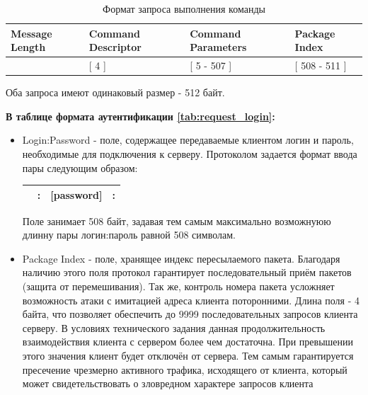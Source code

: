 \begin{table}[h]
	\centering
	\begin{tabular}[center]{| M{2.5cm} | M{2.0cm} | M{7.0cm} | M{2.5cm} |}
	\hline
	Message Length & Command Descriptor & Command Parameters & Package Index \\ \hline
	[ 0 - 3 ] & [ 4 ] & [ 5 - 507 ] & [ 508 - 511 ] \\
	\hline
	\end{tabular}
	\caption{Формат запроса выполнения команды}
	\label{tab:request_command}
\end{table}

Оба запроса имеют одинаковый размер - 512 байт. 

\textbf{В таблице формата аутентификации \ref{tab:request_login}:}
\begin{itemize}
\item Login:Password - поле, содержащее передаваемые клиентом логин и пароль, необходимые для подключения к серверу. Протоколом задается формат ввода пары следующим образом:
\begin{table}[h]
	\centering
	\begin{tabular}{| l l l l |}
	\hline
	[login] & : & [password] & : \\ 
	\hline
	\end{tabular}
\end{table}

Поле занимает 508 байт, задавая тем самым максимально возможнуюю длинну пары логин:пароль равной 508 символам.

\item Package Index - поле, хранящее индекс пересылаемого пакета. Благодаря наличию этого поля протокол гарантирует последовательный приём пакетов (защита от перемешивания). Так же, контроль номера пакета усложняет возможность атаки с имитацией адреса клиента поторонними. Длина поля - 4 байта, что позволяет обеспечить до 9999 последовательных запросов клиента серверу. В условиях технического задания данная продолжительность взаимодействия клиента с сервером более чем достаточна. При превышении этого значения клиент будет отключён от сервера. Тем самым гарантируется пресечение чрезмерно активного трафика, исходящего от клиента, который может свидетельствовать о зловредном характере запросов клиента
\end{itemize}


